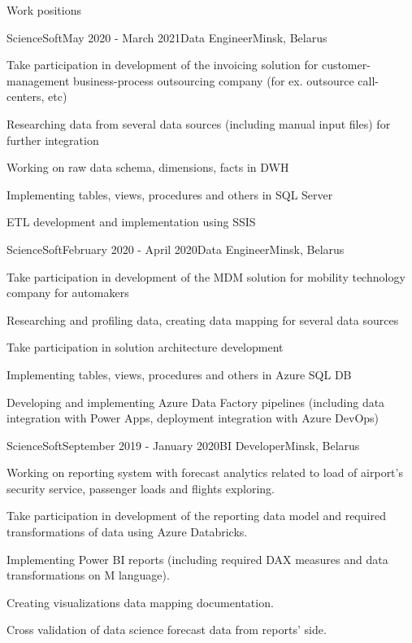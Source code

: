 \documentclass{resume} %
\begin{document}
\begin{rSection}{Work positions}
\begin{rSubsection}{ScienceSoft}{May 2020 - March 2021}{Data Engineer}{Minsk, Belarus}
\item Take participation in development of the invoicing solution for customer-management business-process outsourcing company (for ex. outsource call-centers, etc)
\item Researching data from several data sources (including manual input files) for further integration
\item Working on raw data schema, dimensions, facts in DWH
\item Implementing tables, views, procedures and others in SQL Server
\item ETL development and implementation using SSIS
\end{rSubsection}

\begin{rSubsection}{ScienceSoft}{February 2020 - April 2020}{Data Engineer}{Minsk, Belarus}
\item Take participation in development of the MDM solution for mobility technology company for automakers
\item Researching and profiling data, creating data mapping for several data sources
\item Take participation in solution architecture development
\item Implementing tables, views, procedures and others in Azure SQL DB
\item Developing and implementing Azure Data Factory pipelines (including data integration with Power Apps, deployment integration with Azure DevOps)
\end{rSubsection}

\begin{rSubsection}{ScienceSoft}{September 2019 - January 2020}{BI Developer}{Minsk, Belarus}
\item Working on reporting system with forecast analytics related to load of airport's security service, passenger loads and flights exploring.
\item Take participation in development of the reporting data model and required transformations of data using Azure Databricks.
\item Implementing Power BI reports (including required DAX measures and data transformations on M language).
\item Creating visualizations data mapping documentation.
\item Cross validation of data science forecast data from reports' side.
\end{rSubsection}


\end{rSection}
\end{document}
